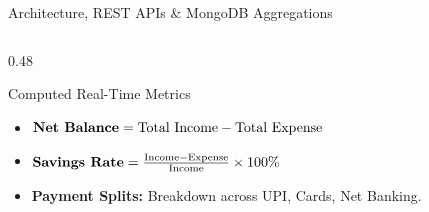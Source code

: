 \documentclass[aspectratio=169, 10pt]{beamer}
\begin{document}
\begin{frame}{Architecture, REST APIs \& MongoDB Aggregations}
\begin{columns}[T]
\begin{column}{0.48\textwidth}
      \begin{exampleblock}{Computed Real-Time Metrics}
        \scriptsize
        \begin{itemize}
          \item $\text{\textbf{Net Balance}} = \text{Total Income} - \text{Total Expense}$
          \item $\text{\textbf{Savings Rate}} = \frac{\text{Income} - \text{Expense}}{\text{Income}} \times 100\%$
          \item \textbf{Payment Splits:} Breakdown across UPI, Cards, Net Banking.
        \end{itemize}
      \end{exampleblock}
    \end{column}
  \end{columns}
\end{frame}
\end{document}
